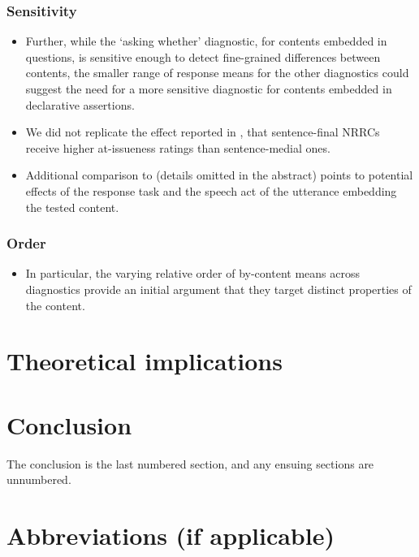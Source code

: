 \documentclass[times,linguex,xcolor]{glossa}
\begin{document}
    \subsubsection{Sensitivity}

      \begin{itemize}
        \item Further, while the `asking whether' diagnostic, for contents embedded in questions, is sensitive enough to detect fine-grained differences between contents, the smaller range of response means for the other diagnostics could suggest the need for a more sensitive diagnostic for contents embedded in declarative assertions.

        \item We did not replicate the effect reported in \citealt{syrett_experimental_2015}, that sentence-final NRRCs receive higher at-issueness ratings than sentence-medial ones.

        \item  Additional comparison to \citealt{syrett_experimental_2015} (details omitted in the abstract) points to potential effects of the response task and the speech act of the utterance embedding the tested content.

      \end{itemize}

    \subsubsection{Order}

      \begin{itemize}
        \item In particular, the varying relative order of by-content means across diagnostics provide an initial argument that they target distinct properties of the content.
      \end{itemize}

\section{Theoretical implications}

\section{Conclusion}

The conclusion is the last numbered section, and any ensuing sections are unnumbered.

\pagebreak
\section*{Abbreviations (if applicable)}\label{abbrev}
\end{document}
